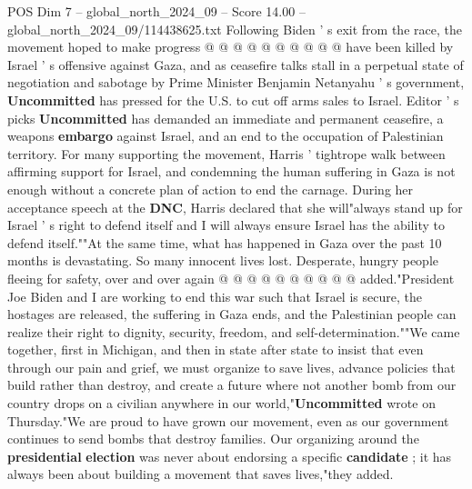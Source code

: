 \begin{textsample}{POS Dim 7 – global\_north\_2024\_09 – Score 14.00 – global\_north\_2024\_09/114438625.txt}
Following Biden ' s exit from the race, the movement hoped to make progress @ @ @ @ @ @ @ @ @ @ have been killed by Israel ' s offensive against Gaza, and as ceasefire talks stall in a perpetual state of negotiation and sabotage by Prime Minister Benjamin Netanyahu ' s government, \textbf{Uncommitted} has pressed for the U.S. to cut off arms sales to Israel.
Editor ' s picks \textbf{Uncommitted} has demanded an immediate and permanent ceasefire, a weapons \textbf{embargo} against Israel, and an end to the occupation of Palestinian territory.
For many supporting the movement, Harris ' tightrope walk between affirming support for Israel, and condemning the human suffering in Gaza is not enough without a concrete plan of action to end the carnage.
During her acceptance speech at the \textbf{DNC}, Harris declared that she will"always stand up for Israel ' s right to defend itself and I will always ensure Israel has the ability to defend itself.""At the same time, what has happened in Gaza over the past 10 months is devastating.
So many innocent lives lost.
Desperate, hungry people fleeing for safety, over and over again @ @ @ @ @ @ @ @ @ @ added."President Joe Biden and I are working to end this war such that Israel is secure, the hostages are released, the suffering in Gaza ends, and the Palestinian people can realize their right to dignity, security, freedom, and self-determination.""We came together, first in Michigan, and then in state after state to insist that even through our pain and grief, we must organize to save lives, advance policies that build rather than destroy, and create a future where not another bomb from our country drops on a civilian anywhere in our world,"\textbf{Uncommitted} wrote on Thursday."We are proud to have grown our movement, even as our government continues to send bombs that destroy families.
Our organizing around the \textbf{presidential} \textbf{election} was never about endorsing a specific \textbf{candidate} ; it has always been about building a movement that saves lives,"they added.

\end{textsample}
